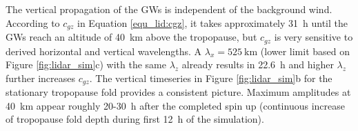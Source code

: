 The vertical propagation of the GWs is independent of the background wind. According to $c_{gz}$ in Equation \ref{equ_lid:cgz}, it takes approximately \SI{31}{\hour} until the GWs reach an altitude of \SI{40}{\kilo\meter} above the tropopause, but $c_{gz}$ is very sensitive to derived horizontal and vertical wavelengths. A $\lambda_x = \SI{525}{\kilo\meter}$ (lower limit based on Figure \ref{fig:lidar_sim}c) with the same $\lambda_z$ already results in \SI{22.6}{\hour} and higher $\lambda_z$ further increases $c_{gz}$. The vertical timeseries in Figure \ref{fig:lidar_sim}b for the stationary tropopause fold provides a consistent picture. Maximum amplitudes at \SI{40}{\kilo\meter} appear roughly 20-\SI{30}{\hour} after the completed spin up (continuous increase of tropopause fold depth during first \SI{12}{\hour} of the simulation).


